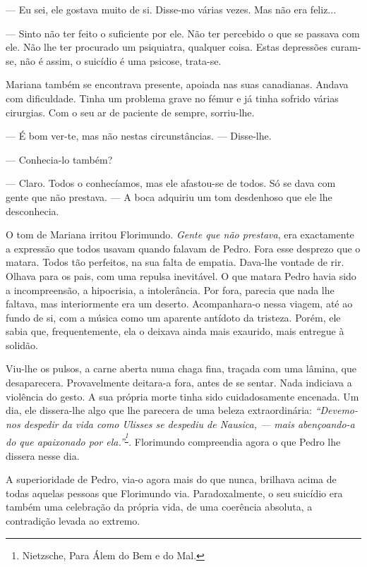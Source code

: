 --- Eu sei, ele gostava muito de si. Disse-mo várias vezes. Mas não era
feliz...

--- Sinto não ter feito o suficiente por ele. Não ter percebido o que se
passava com ele. Não lhe ter procurado um psiquiatra, qualquer coisa.
Estas depressões curam-se, não é assim, o suicídio é uma psicose,
trata-se.

Mariana também se encontrava presente, apoiada nas suas canadianas.
Andava com dificuldade. Tinha um problema grave no fémur e já tinha
sofrido várias cirurgias. Com o seu ar de paciente de sempre,
sorriu-lhe.

--- É bom ver-te, mas não nestas circunstâncias. --- Disse-lhe.

--- Conhecia-lo também?

--- Claro. Todos o conhecíamos, mas ele afastou-se de todos. Só se dava
com gente que não prestava. --- A boca adquiriu um tom desdenhoso que ele
lhe desconhecia.

O tom de Mariana irritou Florimundo. \emph{Gente que não prestava}, era
exactamente a expressão que todos usavam quando falavam de Pedro. Fora
esse desprezo que o matara. Todos tão perfeitos, na sua falta de
empatia. Dava-lhe vontade de rir. Olhava para os pais, com uma repulsa
inevitável. O que matara Pedro havia sido a incompreensão, a hipocrisia,
a intolerância. Por fora, parecia que nada lhe faltava, mas
interiormente era um deserto. Acompanhara-o nessa viagem, até ao fundo
de si, com a música como um aparente antídoto da tristeza. Porém, ele
sabia que, frequentemente, ela o deixava ainda mais exaurido, mais
entregue à solidão.

Viu-lhe os pulsos, a carne aberta numa chaga fina, traçada com uma
lâmina, que desaparecera. Provavelmente deitara-a fora, antes de se
sentar. Nada indiciava a violência do gesto. A sua própria morte tinha
sido cuidadosamente encenada. Um dia, ele dissera-lhe algo que lhe
parecera de uma beleza extraordinária: \emph{``Devemo-nos despedir da
vida como Ulisses se despediu de Nausica, --- mais abençoando-a do que
apaixonado por ela.''}\textsuperscript{\emph{\footnote{Nietzsche, Para
  Álem do Bem e do Mal.}}}\emph{. }Florimundo compreendia agora o que
Pedro lhe dissera nesse dia.

A superioridade de Pedro, via-o agora mais do que nunca, brilhava acima
de todas aquelas pessoas que Florimundo via. Paradoxalmente, o seu
suicídio era também uma celebração da própria vida, de uma coerência
absoluta, a contradição levada ao extremo.

